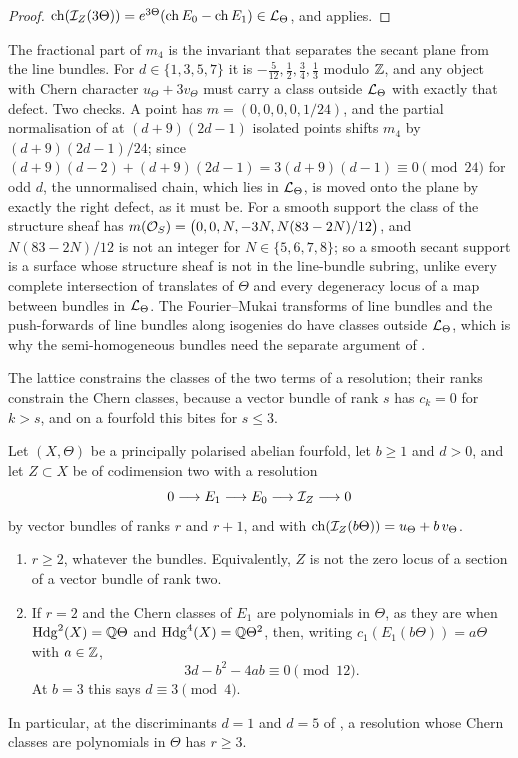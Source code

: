 \begin{proof}
$\operatorname{ch}(\mathcal{I}_{Z}(3\Theta))=e^{3\Theta}(\operatorname{ch} E_{0}-\operatorname{ch} E_{1})\in\mathcal{L}_{\Theta}$, and
 applies.
\end{proof}

\begin{remark}\label{rem:latticedefect}
The fractional part of $m_{4}$ is the invariant that separates the secant
plane from the line bundles. For $d\in\{1,3,5,7\}$ it is
$-\tfrac{5}{12},\tfrac12,\tfrac34,\tfrac13$ modulo $\mathbb{Z}$, and any object with
Chern character $u_{\Theta}+3v_{\Theta}$ must carry a class outside
$\mathcal{L}_{\Theta}$ with exactly that defect. Two checks. A point has
$m=(0,0,0,0,1/24)$, and the partial normalisation of  at
$(d+9)(2d-1)$ isolated points shifts $m_{4}$ by $(d+9)(2d-1)/24$; since
$(d+9)(d-2)+(d+9)(2d-1)=3(d+9)(d-1)\equiv0\pmod{24}$ for odd $d$, the
unnormalised chain, which lies in $\mathcal{L}_{\Theta}$, is moved onto the plane by
exactly the right defect, as it must be. For a smooth support the class of
the structure sheaf has $m(\mathcal{O}_{S})=\bigl(0,0,N,-3N,N(83-2N)/12\bigr)$, and
$N(83-2N)/12$ is not an integer for $N\in\{5,6,7,8\}$; so a smooth secant
support is a surface whose structure sheaf is not in the line-bundle
subring, unlike every complete intersection of translates of $\Theta$ and
every degeneracy locus of a map between bundles in $\mathcal{L}_{\Theta}$. The
Fourier--Mukai transforms of line bundles and the push-forwards of line
bundles along isogenies do have classes outside $\mathcal{L}_{\Theta}$, which is why
the semi-homogeneous bundles need the separate argument of
.
\end{remark}

The lattice constrains the classes of the two terms of a resolution; their
ranks constrain the Chern classes, because a vector bundle of rank $s$ has
$c_{k}=0$ for $k>s$, and on a fourfold this bites for $s\le3$.

\begin{proposition}\label{prop:lowrankburch}
Let $(X,\Theta)$ be a principally polarised abelian fourfold, let $b\ge1$
and $d>0$, and let $Z\subset X$ be of codimension two with a resolution
\[
  0\longrightarrow E_{1}\longrightarrow E_{0}\longrightarrow\mathcal{I}_{Z}
  \longrightarrow0
\]
by vector bundles of ranks $r$ and $r+1$, and with
$\operatorname{ch}(\mathcal{I}_{Z}(b\Theta))=u_{\Theta}+b\,v_{\Theta}$.
\begin{enumerate}[label=\textup{(\roman*)},nosep,leftmargin=2.2em]
\item $r\ge2$, whatever the bundles. Equivalently, $Z$ is not the zero locus
  of a section of a vector bundle of rank two.
\item If $r=2$ and the Chern classes of $E_{1}$ are polynomials in $\Theta$,
  as they are when $\mathrm{Hdg}^{2}(X)=\mathbb{Q}\Theta$ and $\mathrm{Hdg}^{4}(X)=\mathbb{Q}\Theta^{2}$,
  then, writing $c_{1}(E_{1}(b\Theta))=a\Theta$ with $a\in\mathbb{Z}$,
  \[
    3d-b^{2}-4ab\equiv0\pmod{12}.
  \]
  At $b=3$ this says $d\equiv3\pmod4$.
\end{enumerate}
In particular, at the discriminants $d=1$ and $d=5$ of
, a resolution whose Chern classes are
polynomials in $\Theta$ has $r\ge3$.
\end{proposition}

